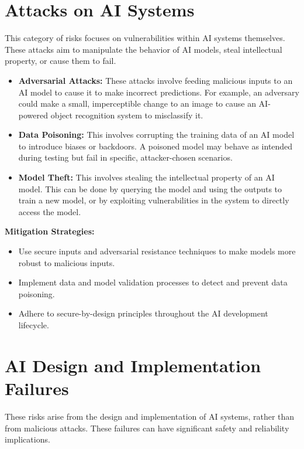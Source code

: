 \section{Attacks on AI Systems}
\label{sec:attacks_on_ai}

This category of risks focuses on vulnerabilities within AI systems themselves. These attacks aim to manipulate the behavior of AI models, steal intellectual property, or cause them to fail.

\begin{itemize}
    \item \textbf{Adversarial Attacks:} These attacks involve feeding malicious inputs to an AI model to cause it to make incorrect predictions. For example, an adversary could make a small, imperceptible change to an image to cause an AI-powered object recognition system to misclassify it.
    \item \textbf{Data Poisoning:} This involves corrupting the training data of an AI model to introduce biases or backdoors. A poisoned model may behave as intended during testing but fail in specific, attacker-chosen scenarios.
    \item \textbf{Model Theft:} This involves stealing the intellectual property of an AI model. This can be done by querying the model and using the outputs to train a new model, or by exploiting vulnerabilities in the system to directly access the model.
\end{itemize}

\begin{tipbox}
    \textbf{Mitigation Strategies:}
    \begin{itemize}
        \item Use secure inputs and adversarial resistance techniques to make models more robust to malicious inputs.
        \item Implement data and model validation processes to detect and prevent data poisoning.
        \item Adhere to secure-by-design principles throughout the AI development lifecycle.
    \end{itemize}
\end{tipbox}

\section{AI Design and Implementation Failures}
\label{sec:ai_design_failures}

These risks arise from the design and implementation of AI systems, rather than from malicious attacks. These failures can have significant safety and reliability implications.

